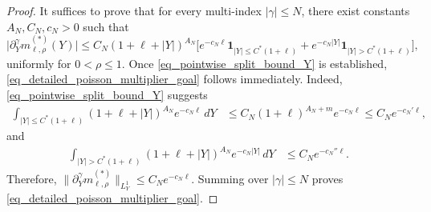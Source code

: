 \documentclass[12pt]{amsart}
\begin{document}
\begin{proof}
It suffices to prove that for every multi-index $|\gamma|\le N$, there exist constants $A_N, C_N, c_N>0$ such that
\begin{equation}\label{eq_pointwise_split_bound_Y}
    \bigl|
        \partial_Y^\gamma m_{\ell,\rho}^{(*)}(Y)
    \bigr|
    \le
    C_N
    (1+\ell+|Y|)^{A_N}
    \bigl[
        e^{-c_N \ell}\mathbf 1_{|Y|\le C^* (1+\ell)}
        +
        e^{-c_N |Y|}\mathbf 1_{|Y|>C^* (1+\ell)}
    \bigr],
\end{equation}
uniformly for $0<\rho\le 1$. Once \eqref{eq_pointwise_split_bound_Y} is established, \eqref{eq_detailed_poisson_multiplier_goal} follows immediately. Indeed, \eqref{eq_pointwise_split_bound_Y} suggests
\begin{align*}
    \int_{|Y|\le C^* (1+\ell)}
    (1+\ell+|Y|)^{A_N}e^{-c_N \ell} \, dY
    &\le
    C_N (1+\ell)^{A_N + m}e^{-c_N \ell}
    \le
    C_N e^{-c_N'\ell},
\end{align*}
and
\begin{align*}
    \int_{|Y|> C^* (1+\ell)}
    (1+\ell+|Y|)^{A_N}e^{-c_N |Y|} \, dY
    &\le
    C_N e^{-c_N''\ell}.
\end{align*}
Therefore, $\bigl\| \partial_Y^\gamma m_{\ell,\rho}^{(*)} \bigr\|_{L^1_Y} \le C_N e^{-c_N \ell}$.
Summing over $|\gamma|\le N$ proves \eqref{eq_detailed_poisson_multiplier_goal}.


\end{proof}
\end{document}
